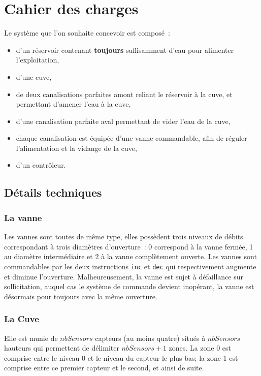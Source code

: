 \section{Cahier des charges}

Le système que l'on souhaite concevoir est composé~:
\begin{itemize}
\item d'un réservoir contenant {\bf toujours} suffisamment d'eau pour alimenter l'exploitation,
\item d'une cuve,
\item de deux canalisations parfaites amont reliant le réservoir à la cuve, et permettant d'amener l'eau à la cuve,
\item d'une canalisation parfaite aval permettant de vider l'eau de la cuve,
\item chaque canalisation est équipée d'une vanne commandable, afin de réguler l'alimentation et la vidange de la cuve,
\item d'un contrôleur.
\end{itemize}

\subsection{Détails techniques}

\subsubsection{La vanne}
Les vannes sont toutes de même type, elles possèdent trois niveaux de débits correspondant à trois diamètres d'ouverture~: 0 correspond à la vanne fermée, 1 au diamètre intermédiaire et 2 à la vanne complètement ouverte. Les vannes sont commandables par les deux instructions {\tt inc} et {\tt dec} qui respectivement augmente et diminue l'ouverture. Malheureusement, la vanne est sujet à défaillance sur sollicitation, auquel cas le système de commande devient inopérant, la vanne est désormais pour toujours avec la même ouverture.

\subsubsection{La Cuve}
Elle est munie de $nbSensors$ capteurs (au moins quatre) situés à $nbSensors$ hauteurs qui permettent de délimiter $nbSensors+1$ zones. La zone 0 est comprise entre le niveau 0 et le niveau du capteur le plus bas; la zone 1 est comprise entre ce premier capteur et le second, et ainsi de suite.

